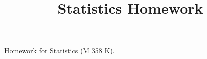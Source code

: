 \documentclass[fontsize=9pt]{article}
\title{Statistics Homework}
\date{}
\begin{document}
\maketitle
Homework for Statistics (M 358 K). 

\tableofcontents
\newpage
    
\end{document}
